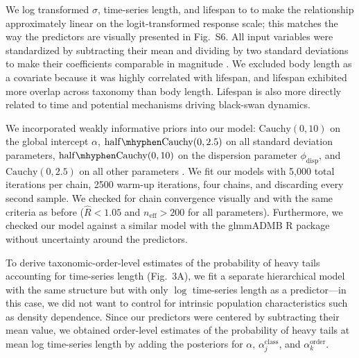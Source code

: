 \documentclass[9pt,twocolumn,twoside]{pnas-new}
\newcommand{\figcorrelates}{{6}}
\begin{document}
{We log transformed \(\sigma\), time-series length, and lifespan to 
to make the
relationship approximately linear on the logit-transformed response scale;
this matches the way the predictors are visually presented in 
Fig.~S\figcorrelates. 
All input variables were standardized by subtracting their mean and dividing by two
standard deviations to make their coefficients comparable in
magnitude \cite{gelman2008c}. We excluded body length as a covariate because it
was highly correlated with lifespan, and lifespan exhibited more overlap across
taxonomy than body length. Lifespan is also more directly related to time and
potential mechanisms driving black-swan dynamics.

We incorporated weakly informative priors into our model: \(\mathrm{Cauchy}(0,
10)\) on the global intercept \(\alpha\), \(\mathrm{half\mhyphen Cauchy}(0,
2.5)\) on all standard deviation parameters, \(\mathrm{half\mhyphen Cauchy}(0,
10)\) on the dispersion parameter \(\phi_\mathrm{disp}\), and
\(\mathrm{Cauchy}(0, 2.5)\) on all other parameters \cite{gelman2006c,
gelman2008d}. 
We fit our
models with 5,000 total iterations per chain, 2500 warm-up iterations, four
chains, and discarding every second sample. We checked for chain convergence
visually and with the same criteria as before (\(\widehat{R} < 1.05\) and
\(n_\mathrm{eff} >200\) for all parameters). Furthermore, we checked our model
against a similar model with the glmmADMB \textsf{R} package \cite{glmmadmb}
without uncertainty around the predictors.

To derive taxonomic-order-level estimates of the probability of heavy tails
accounting for time-series length (Fig.~3A), we fit a separate hierarchical
model with the same structure but with only \(\log\) time-series length as a
predictor---in this case, we did not want to control for intrinsic population
characteristics such as density dependence. Since our predictors were centered
by subtracting their mean value, we obtained order-level estimates of the
probability of heavy tails at mean log time-series length by adding the
posteriors for \(\alpha\), \(\alpha^\mathrm{class}_j\), and
\(\alpha^\mathrm{order}_k\).

}
\end{document}
